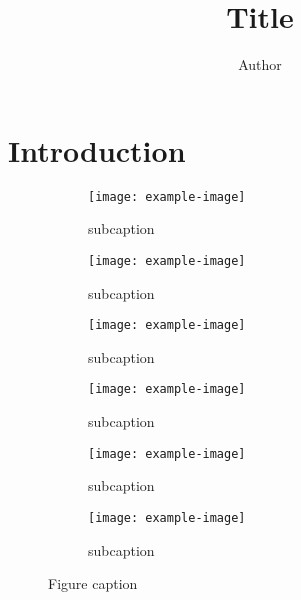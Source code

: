 \documentclass{article}
\begin{document}
\title{Title}
\author{Author}
\maketitle
\begin{abstract}
    \lipsum[1]
\end{abstract}

\section{Introduction}
\lipsum[1] \citep{batra2022Machine}

\begin{figure*}[!h]
    \begin{subfigure}[h]{0.3\linewidth}
        \texttt{[image: example-image]}
        \caption{subcaption}
    \end{subfigure}\hfill
    \begin{subfigure}[h]{0.3\linewidth}
        \texttt{[image: example-image]}
        \caption{subcaption}
    \end{subfigure}\hfill
    \begin{subfigure}[h]{0.3\linewidth}
        \texttt{[image: example-image]}
        \caption{subcaption}
    \end{subfigure}\hfill
    \begin{subfigure}[h]{0.3\linewidth}
        \texttt{[image: example-image]}
        \caption{subcaption}
    \end{subfigure}\hfill
    \begin{subfigure}[h]{0.3\linewidth}
        \texttt{[image: example-image]}
        \caption{subcaption}
    \end{subfigure}\hfill
    \begin{subfigure}[h]{0.3\linewidth}
        \texttt{[image: example-image]}
        \caption{subcaption}
    \end{subfigure}\hfill
    \caption{Figure caption}
\end{figure*}

\lipsum[1]



\end{document}
